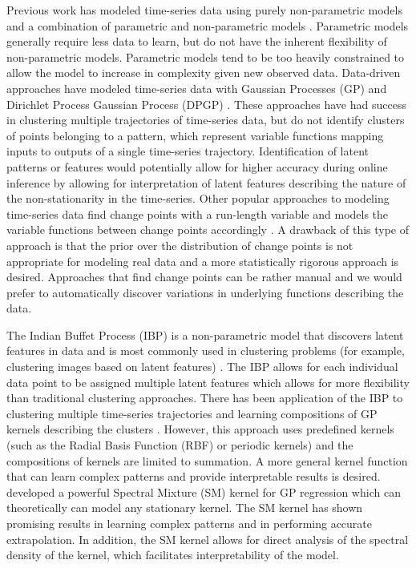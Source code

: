 \documentclass{article}
\begin{document}
Previous work has modeled time-series data using purely non-parametric models \cite{FastNonP} and a combination of parametric and non-parametric models \cite{StructDiscNonPara}. Parametric models generally require less data to learn, but do not have the inherent flexibility of non-parametric models. Parametric models tend to be too heavily constrained to allow the model to increase in complexity given new observed data. Data-driven approaches have modeled time-series data with Gaussian Processes (GP) and Dirichlet Process Gaussian Process (DPGP) \cite{DPGPwithConstraints}. These approaches have had success in clustering multiple trajectories of time-series data, but do not identify clusters of points belonging to a pattern, which represent variable functions mapping inputs to outputs of a single time-series trajectory. Identification of latent patterns or features would potentially allow for higher accuracy during online inference by allowing for interpretation of latent features describing the nature of the non-stationarity in the time-series. Other popular approaches to modeling time-series data find change points with a run-length variable and models the variable functions between change points accordingly \cite{GPChangePointModels}. A drawback of this type of approach is that the prior over the distribution of change points is not appropriate for modeling real data and a more statistically rigorous approach is desired. Approaches that find change points can be rather manual and we would prefer to automatically discover variations in underlying functions describing the data.

The Indian Buffet Process (IBP) is a non-parametric model that discovers latent features in data and is most commonly used in clustering problems (for example, clustering images based on latent features) \cite{IBPshort}. The IBP allows for each individual data point to be assigned multiple latent features which allows for more flexibility than traditional clustering approaches. There has been application of the IBP to clustering multiple time-series trajectories and learning compositions of GP kernels describing the clusters \cite{IBPGP}. However, this approach uses predefined kernels (such as the Radial Basis Function (RBF) or periodic kernels) and the compositions of kernels are limited to summation. A more general kernel function that can learn complex patterns and provide interpretable results is desired. \cite{SMK} developed a powerful Spectral Mixture (SM) kernel for GP regression which can theoretically can model any stationary kernel. The SM kernel has shown promising results in learning complex patterns and in performing accurate extrapolation. In addition, the SM kernel allows for direct analysis of the spectral density of the kernel, which facilitates interpretability of the model.
\end{document}
